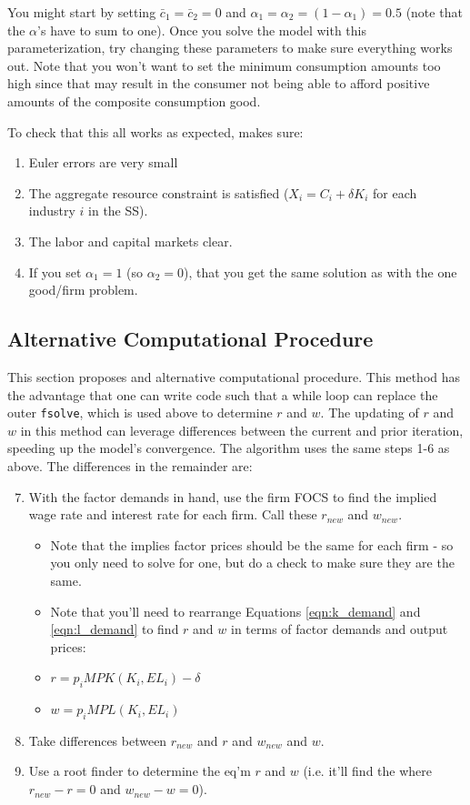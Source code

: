 \documentclass[letterpaper,12pt]{article}
\theoremstyle{definition}
\begin{document}
\begin{spacing}{1.5}
You might start by setting $\bar{c}_{1}=\bar{c}_{2}=0$ and $\alpha_{1}=\alpha_{2}=(1-\alpha_{1})=0.5$ (note that the $\alpha$'s have to sum to one).  Once you solve the model with this parameterization, try changing these parameters to make sure everything works out.  Note that you won't want to set the minimum consumption amounts too high since that may result in the consumer not being able to afford positive amounts of the composite consumption good.

To check that this all works as expected, makes sure:
\begin{enumerate}
\item Euler errors are very small
\item The aggregate resource constraint is satisfied ($X_{i}=C_{i}+\delta K_{i}$ for each industry $i$ in the SS).
\item The labor and capital markets clear.
\item If you set $\alpha_{1}=1$ (so $\alpha_{2}=0$), that you get the same solution as with the one good/firm problem.
\end{enumerate}

\subsection*{Alternative Computational Procedure}

This section proposes and alternative computational procedure.  This method has the advantage that one can write code such that a while loop can replace the outer  \texttt{fsolve}, which is used above to determine $r$ and $w$.  The updating of $r$ and $w$ in this method can leverage differences between the current and prior iteration, speeding up the model's convergence.  The algorithm uses the same steps 1-6 as above.  The differences in the remainder are:

\begin{enumerate}
\setcounter{enumi}{6}
\item With the factor demands in hand, use the firm FOCS to find the implied wage rate and interest rate for each firm. Call these $r_{new}$ and $w_{new}$.
	\begin{itemize}
	\item Note that the implies factor prices should be the same for each firm - so you only need to solve for one, but do a check to make sure they are the same.
	\item Note that you'll need to rearrange Equations \ref{eqn:k_demand} and \ref{eqn:l_demand} to find $r$ and $w$ in terms of factor demands and output prices:
	\item $r = p_{i} MPK(K_{i},EL_{i}) - \delta$
	\item $w = p_{i} MPL(K_{i},EL_{i}) $
	\end{itemize}
\item Take differences between $r_{new}$ and $r$ and $w_{new}$ and $w$.
\item Use a root finder to determine the eq'm $r$ and $w$ (i.e. it'll find the where $r_{new}-r=0$ and $w_{new}-w=0$).
\end{enumerate}


\end{spacing}
\end{document}
